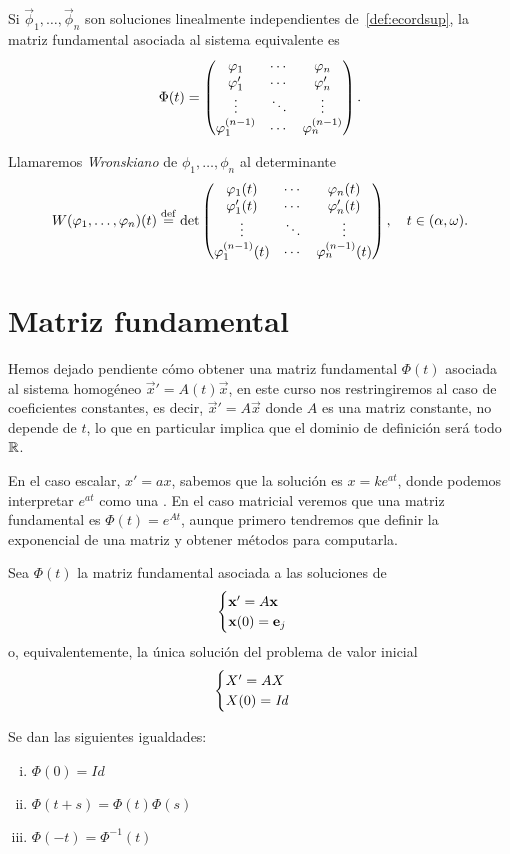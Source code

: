 \documentclass[../ecuaciones_diferenciales.tex]{subfiles}
\begin{document}
Si \(\vec{\phi}_1, \dots, \vec{\phi}_n\) son soluciones linealmente 
independientes de~\ref{def:ecordsup}, la matriz fundamental asociada al 
sistema equivalente es
\[\Phi(t) = \begin{pmatrix}
		\varphi_1 & \cdots & \varphi_n \\
		\varphi'_1 & \cdots & \varphi'_n \\
		\vdots & \ddots & \vdots \\
		\varphi^{(n - 1)}_1 & \cdots & \varphi^{(n - 1)}_n\end{pmatrix}.\]

\begin{definition}[Wronskiano]
	Llamaremos \emph{Wronskiano} de \(\phi_1, \dots, \phi_n\) al determinante
	\[W(\varphi_1, \dots, \varphi_n)(t) \overset{\operatorname{def}}{=} \det\begin{pmatrix}
			\varphi_1(t) & \cdots & \varphi_n(t) \\
			\varphi'_1(t) & \cdots & \varphi'_n(t) \\
			\vdots & \ddots & \vdots \\
			\varphi^{(n - 1)}_1(t) & \cdots & \varphi^{(n - 1)}_n(t) \\
		\end{pmatrix}, \quad t \in (\alpha, \omega).\]
\end{definition}

\section{Matriz fundamental}

Hemos dejado pendiente cómo obtener una matriz fundamental \(\Phi(t)\) asociada
al sistema homogéneo \(\vec{x}' = A(t)\vec{x}\), en este curso nos
restringiremos al caso de coeficientes constantes, es decir,
\(\vec{x}' = A\vec{x}\) donde \(A\) es una matriz constante, no depende de
\(t\), lo que en particular implica que el dominio de definición será todo
\(\mathbb{R}\).

En el caso escalar, \(x' = ax\), sabemos que la solución es \(x = ke^{at}\),
donde podemos interpretar \(e^{at}\) como una 
. 
En el caso matricial veremos que una matriz fundamental es
\(\Phi(t) = e^{At}\), aunque primero tendremos que definir la exponencial de una
matriz y obtener métodos para computarla.

\begin{lemma}\label{lem:expphi}
	Sea \(\Phi(t)\) la matriz fundamental asociada a las soluciones de
	\[\begin{cases}
		\mathbf{x}' = A\mathbf{x} \\
		\mathbf{x}(0) = \mathbf{e}_j\end{cases}\]
	o, equivalentemente, la única solución del problema de valor inicial
	\[\begin{cases}
			X' = AX \\
			X(0) = \mathit{Id}\end{cases}\]

	Se dan las siguientes igualdades:
	\begin{multicols}{3}
		\begin{enumerate}[(i)]
			\item \(\displaystyle \Phi(0) = \mathit{Id}\)

			\item \(\displaystyle \Phi(t + s) = \Phi(t) \Phi(s)\)

			\item \(\displaystyle \Phi(-t) = \Phi^{-1}(t)\)
		\end{enumerate}
	\end{multicols}
\end{lemma}
\end{document}
